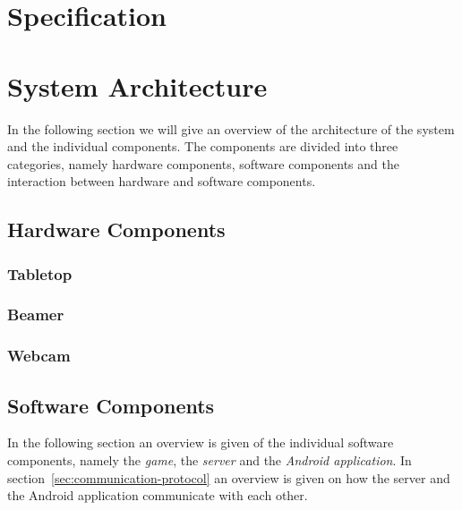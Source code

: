 \documentclass[a4paper,10pt]{article}
\begin{document}
\section{Specification}

\section{System Architecture}
\label{sec:system-architecture}
In the following section we will give an overview of the architecture of the system and the individual components.
The components are divided into three categories, namely hardware components, software components and the interaction between hardware and software components.

	\subsection{Hardware Components}
		
		\subsubsection{Tabletop}
		
		\subsubsection{Beamer}
		
		\subsubsection{Webcam}


	\subsection{Software Components}
	\label{sec:software-components}
	In the following section an overview is given of the individual software components, namely the \emph{game}, the \emph{server} and the \emph{Android application}.
	In section~\ref{sec:communication-protocol} an overview is given on how the server and the Android application communicate with each other.
\end{document}
